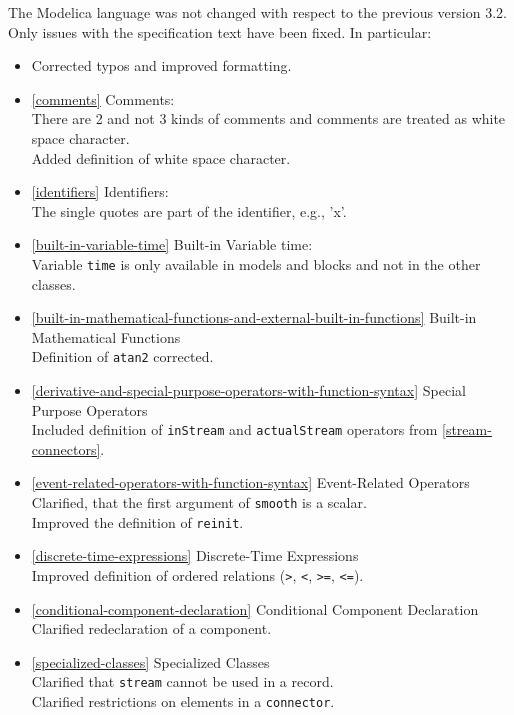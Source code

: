 The Modelica language was not changed with respect to the previous
version 3.2. Only issues with the specification text have been fixed. In
particular:
\begin{itemize}
\item
  Corrected typos and improved formatting.
\item
  \cref{comments} Comments:\\
  There are 2 and not 3 kinds of comments and comments are treated as
  white space character.\\
  Added definition of white space character.
\item
  \cref{identifiers} Identifiers:\\
  The single quotes are part of the identifier, e.g., 'x'.
\item
  \cref{built-in-variable-time} Built-in Variable time:\\
  Variable \lstinline!time! is only available in models and blocks and not in the
  other classes.
\item
  \cref{built-in-mathematical-functions-and-external-built-in-functions} Built-in Mathematical Functions\\
  Definition of \lstinline!atan2! corrected.
\item
  \cref{derivative-and-special-purpose-operators-with-function-syntax} Special Purpose Operators\\
  Included definition of \lstinline!inStream! and \lstinline!actualStream! operators from \cref{stream-connectors}.
\item
  \cref{event-related-operators-with-function-syntax} Event-Related Operators\\
  Clarified, that the first argument of \lstinline!smooth! is a scalar.\\
  Improved the definition of \lstinline!reinit!.
\item
  \cref{discrete-time-expressions} Discrete-Time Expressions\\
  Improved definition of ordered relations (\lstinline!>!, \lstinline!<!, \lstinline!>=!, \lstinline!<=!).
\item
  \cref{conditional-component-declaration} Conditional Component Declaration\\
  Clarified redeclaration of a component.
\item
  \cref{specialized-classes} Specialized Classes\\
  Clarified that \lstinline!stream! cannot be used in a record.\\
  Clarified restrictions on elements in a \lstinline!connector!.\\

\end{itemize}
